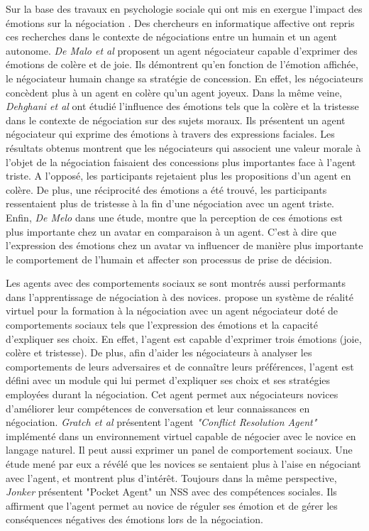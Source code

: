 	 Sur la base des travaux en psychologie sociale qui ont mis en exergue l'impact des émotions sur la négociation \cite{van2006power}. Des chercheurs en informatique affective ont repris ces recherches dans le contexte de négociations entre un humain et un agent autonome. \emph{De Malo et al} \cite{de2011effect,de2015humans} proposent un agent négociateur capable d'exprimer des émotions de colère et de joie. Ils démontrent qu'en fonction de l'émotion affichée, le négociateur humain change sa stratégie de concession. En effet, les négociateurs concèdent plus à un agent en colère qu'un agent joyeux. Dans la même veine, \emph{Dehghani et al} \cite{dehghani2014interpersonal} ont étudié l'influence des émotions tels que la colère et la tristesse dans le contexte de négociation sur des sujets moraux. Ils présentent un agent négociateur qui exprime des émotions à travers des expressions faciales.
	 Les résultats obtenus montrent que les négociateurs qui associent une valeur morale à l'objet de la négociation faisaient des concessions plus importantes face à l'agent triste. A l'opposé, les participants rejetaient plus les propositions d'un agent en colère. De plus, une réciprocité des émotions a été trouvé, les participants ressentaient plus de tristesse à la fin d'une négociation avec un agent triste.  
	 Enfin, \emph{De Melo} \cite{de2015humans} dans une étude, montre que la perception de ces émotions est plus importante chez un avatar en comparaison à un agent. C'est à dire que l'expression des émotions chez un avatar va influencer de manière plus importante le comportement de l'humain et affecter son processus de prise de décision.  
	 
	 
	 Les agents avec des comportements sociaux se sont montrés aussi performants dans l'apprentissage de négociation à des novices. \cite{broekens2012virtual} propose un système de réalité virtuel pour la formation à la négociation avec un agent négociateur doté de comportements sociaux tels que l'expression des émotions et la capacité d'expliquer ses choix. En effet, l'agent est capable d'exprimer trois émotions (joie, colère et tristesse). De plus, afin d'aider les négociateurs à analyser les comportements de leurs adversaires et de connaître leurs préférences, l'agent est défini avec un module qui lui permet d'expliquer ses choix et ses stratégies employées durant la négociation. Cet agent permet aux négociateurs novices d'améliorer leur compétences de conversation et leur connaissances en négociation. 
	 \emph{Gratch et al} \cite{gratch2016benefits} présentent l'agent \textit{"Conflict Resolution Agent"} implémenté dans un environnement virtuel capable de négocier avec le novice en langage naturel. Il peut aussi exprimer un panel de comportement sociaux. Une étude mené par eux a révélé que les novices se sentaient plus à l'aise en négociant avec l'agent, et montrent plus d'intérêt. Toujours dans la même perspective, \emph{Jonker} \cite{jonker2012negotiating} présentent "Pocket Agent" un NSS avec des compétences sociales. Ils affirment que l'agent permet au novice de réguler ses émotion et de gérer les conséquences négatives des émotions lors de la négociation.
	 
